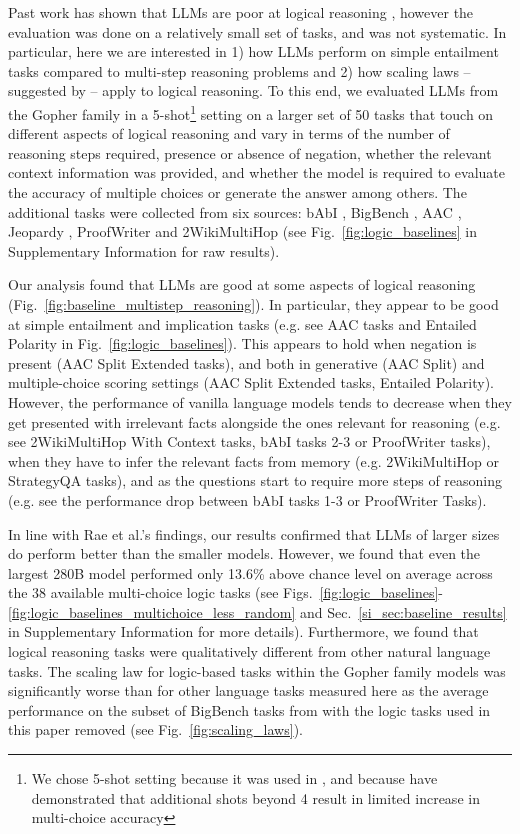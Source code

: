 Past work has shown that LLMs are poor at logical reasoning \citep{rae2021scaling}, however the evaluation was done on a relatively small set of tasks, and was not systematic. In particular, here we are interested in 1) how LLMs perform on simple entailment tasks compared to multi-step reasoning problems and 2) how scaling laws -- suggested by \cite{rae2021scaling} -- apply to logical reasoning. To this end, we evaluated LLMs from the Gopher family in a 5-shot\footnote{We chose 5-shot setting because it was used in \citep{rae2021scaling}, and because \citep{min2022rethinking} have demonstrated that additional shots beyond 4 result in limited increase in multi-choice accuracy} setting on a larger set of 50  tasks that touch on different aspects of logical reasoning and vary in terms of the number of reasoning steps required, presence or absence of negation, whether the relevant context information was provided, and whether the model is required to evaluate the accuracy of multiple choices or generate the answer among others. The additional tasks were collected from six sources: bAbI \citep{weston2015towards}, BigBench \citep{BigBench}, AAC \citep{betz2020critical}, Jeopardy \citep{tunguz_2019}, ProofWriter \citep{tafjord2020proofwriter} and 2WikiMultiHop \citep{welbl2018constructing} (see Fig.~\ref{fig:logic_baselines} in Supplementary Information for raw results).

Our analysis found that LLMs are good at some aspects of logical reasoning (Fig.~\ref{fig:baseline_multistep_reasoning}). In particular, they appear to be good at simple entailment and implication tasks (e.g. see AAC tasks and Entailed Polarity in Fig.~\ref{fig:logic_baselines}). This appears to hold when negation is present (AAC Split Extended tasks), and both in generative (AAC Split) and multiple-choice scoring settings (AAC Split Extended tasks, Entailed Polarity). However, the performance of vanilla language models tends to decrease when they get presented with irrelevant facts alongside the ones relevant for reasoning (e.g. see 2WikiMultiHop With Context tasks, bAbI tasks 2-3 or ProofWriter tasks), when they have to infer the relevant facts from memory (e.g. 2WikiMultiHop or StrategyQA tasks), and as the questions start to require more steps of reasoning (e.g. see the performance drop between bAbI tasks 1-3 or ProofWriter Tasks).

In line with Rae et al.'s findings, our results confirmed that LLMs of larger sizes do perform better than the smaller models. However, we found that even the largest 280B model performed only 13.6\% above chance level on average across the 38 available multi-choice logic tasks  (see Figs.~\ref{fig:logic_baselines}-\ref{fig:logic_baselines_multichoice_less_random} and Sec.~\ref{si_sec:baseline_results} in Supplementary Information for more details). Furthermore, we found that logical reasoning tasks were qualitatively different from other natural language tasks. The scaling law for logic-based tasks within the Gopher family models was significantly worse than for other language tasks measured here as the average performance on the subset of BigBench tasks from \citep{rae2021scaling} with the logic tasks used in this paper removed (see Fig.~\ref{fig:scaling_laws}). 

